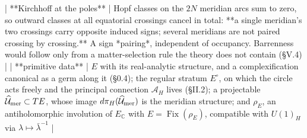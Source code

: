 | **Kirchhoff at the poles** | Hopf classes on the $2N$ meridian arcs sum to zero, so outward classes at all equatorial crossings cancel in total: **a single meridian's two crossings carry opposite induced signs; several meridians are not paired crossing by crossing.** A sign *pairing*, independent of occupancy. Barrenness would follow only from a matter-selection rule the theory does not contain (§V.4) |
| **primitive data** | $E$ with its real-analytic structure, and a complexification canonical as a germ along it (§0.4); the regular stratum $E^\circ$, on which the circle acts freely and the principal connection $\mathcal A_H$ lives (§II.2); a projectable $\widehat{\mathcal{U} }_{\rm mer}\subset TE$, whose image $d\pi_H(\widehat{\mathcal{U} }_{\rm mer})$ is the meridian structure; and $\rho_E$, an antiholomorphic involution of $E_\mathbb{C}$ with $E = \operatorname{Fix}(\rho_E)$, compatible with $U(1)_H$ via $\lambda\mapsto\bar\lambda^{-1}$ |
